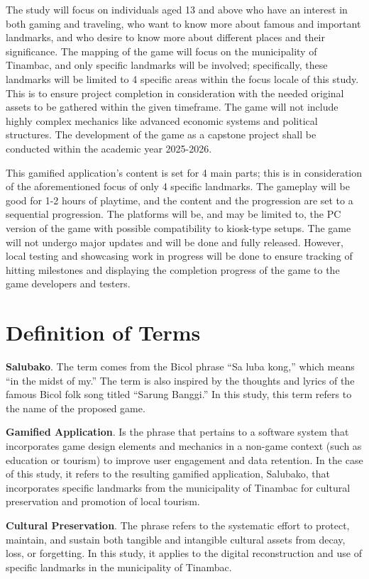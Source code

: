 \documentclass[11pt]{research}
\begin{document}
The study will focus on individuals aged 13 and above who have an interest in both gaming and traveling, who want to know more about famous and important landmarks, and who desire to know more about different places and their significance. The mapping of the game will focus on the municipality of Tinambac, and only specific landmarks will be involved; specifically, these landmarks will be limited to 4 specific areas within the focus locale of this study. This is to ensure project completion in consideration with the needed original assets to be gathered within the given timeframe. The game will not include highly complex mechanics like advanced economic systems and political structures. The development of the game as a capstone project shall be conducted within the academic year 2025-2026.

This gamified application’s content is set for 4 main parts; this is in consideration of the aforementioned focus of only 4 specific landmarks. The gameplay will be good for 1-2 hours of playtime, and the content and the progression are set to a sequential progression. The platforms will be, and may be limited to, the PC version of the game with possible compatibility to kiosk-type setups. The game will not undergo major updates and will be done and fully released. However, local testing and showcasing work in progress will be done to ensure tracking of hitting milestones and displaying the completion progress of the game to the game developers and testers.

\section{Definition of Terms}
\textbf{Salubako}. The term comes from the Bicol phrase “Sa luba kong,” which means “in the midst of my.” The term is also inspired by the thoughts and lyrics of the famous Bicol folk song titled “Sarung Banggi.” In this study, this term refers to the name of the proposed game.

\textbf{Gamified Application}. Is the phrase that pertains to a software system that incorporates game design elements and mechanics in a non-game context (such as education or tourism) to improve user engagement and data retention. In the case of this study, it refers to the resulting gamified application, Salubako, that incorporates specific landmarks from the municipality of Tinambac for cultural preservation and promotion of local tourism.

\textbf{Cultural Preservation}. The phrase refers to the systematic effort to protect, maintain, and sustain both tangible and intangible cultural assets from decay, loss, or forgetting. In this study, it applies to the digital reconstruction and use of specific landmarks in the municipality of Tinambac.
\end{document}

